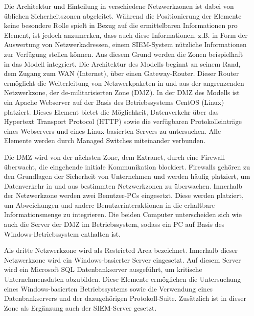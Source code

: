 Die Architektur und Einteilung in verschiedene Netzwerkzonen ist dabei von üblichen Sicherheitszonen abgeleitet. Während die Positionierung der Elemente keine besondere Rolle spielt in Bezug auf die ermittelbaren Informationen pro Element, ist jedoch anzumerken, dass auch diese Informationen, z.B. in Form der Auswertung von Netzwerkadressen, einem SIEM-System nützliche Informationen zur Verfügung stellen können. Aus diesem Grund werden die Zonen beispielhaft in das Modell integriert. Die Architektur des Modells beginnt an seinem \glqq Rand\grqq , dem Zugang zum WAN (Internet), über einen Gateway-Router. Dieser Router ermöglicht die Weiterleitung von Netzwerkpaketen in und aus der angrenzenden Netzwerkzone, der de-militarisierten Zone (DMZ). 
In der DMZ des Modells ist ein Apache Webserver auf der Basis des Betriebssystems \glqq CentOS (Linux)\grqq{} platziert. Dieses Element bietet die Möglichkeit, Datenverkehr über das Hypertext Transport Protocol (HTTP) sowie die verfügbaren Protokolleinträge eines Webservers und eines Linux-basierten Servers zu untersuchen. Alle Elemente werden durch \glqq Managed Switches\grqq{}  miteinander verbunden.

Die DMZ wird von der nächsten Zone, dem Extranet, durch eine Firewall überwacht, die eingehende initiale Kommunikation blockiert. Firewalls gehören zu den Grundlagen der Sicherheit von Unternehmen und werden häufig platziert, um Datenverkehr in und aus bestimmten Netzwerkzonen zu überwachen. Innerhalb der Netzwerkzone werden zwei Benutzer-PCs eingesetzt. Diese werden platziert, um Abweichungen und andere Benutzerinteraktionen in die erhaltbare Informationsmenge zu integrieren. Die beiden Computer unterscheiden sich wie auch die Server der DMZ im Betriebssystem, sodass ein PC auf Basis des Windows-Betriebssystem enthalten ist.

Als dritte Netzwerkzone wird als \glqq Restricted Area\grqq{}  bezeichnet. Innerhalb dieser Netzwerkzone wird ein Windows-basierter Server eingesetzt. Auf diesem Server wird ein Microsoft SQL Datenbankserver ausgeführt, um kritische Unternehmensdaten abzubilden. Diese Elemente ermöglichen die Untersuchung eines Windows-basierten Betriebssystems sowie die Verwendung eines Datenbankservers und der dazugehörigen Protokoll-Suite.
Zusätzlich ist in dieser Zone als Ergänzung auch der SIEM-Server gesetzt.

